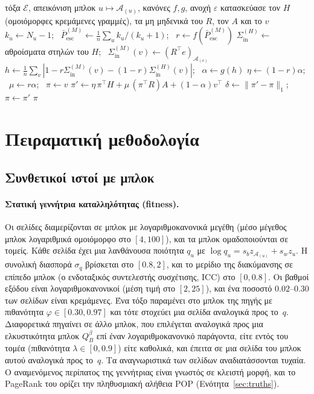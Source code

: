 \documentclass[11pt,a4paper]{article}
\theoremstyle{definition}
\theoremstyle{remark}
\newcommand{\Pbar}{\bar P^{(M)}_{\mathrm{esc}}}
\newcommand{\Sin}{\Sigma_{\mathrm{in}}}
\begin{document}
\begin{algorithm}[t]
\caption{Βαθμονομημένο NCDawareRank δύο σταδίων}
\label{alg:twostage}
\begin{algorithmic}[1]
\Require τόξα $\mathcal E$, απεικόνιση μπλοκ $u\mapsto\mathcal A_{(u)}$, κανόνες $f,g$, ανοχή $\varepsilon$
\State κατασκεύασε τον $H$ (ομοιόμορφες κρεμάμενες γραμμές), τα μη μηδενικά του $R$, τον $A$ και το $v$ 
\State $k_u\gets N_u-1$; \ $\Pbar\gets\frac1n\sum_u k_u/(k_u+1)$; \ $r\gets f(\Pbar)$ 
\State $\Sin^{(H)}\gets$ αθροίσματα στηλών του $H$; \ $\Sin^{(M)}(v)\gets(R^\top e)_{\mathcal A_{(v)}}$
\State $h\gets\frac1n\sum_v|1-r\Sin^{(M)}(v)-(1-r)\Sin^{(H)}(v)|$; \ $\alpha\gets g(h)$ 
\State $\eta\gets(1-r)\alpha$; \ $\mu\gets r\alpha$; \ $\pi\gets v$
\Repeat
  \State $\pi'\gets\eta\,\pi^\top H+\mu\,(\pi^\top R)A+(1-\alpha)v^\top$ 
  \State $\delta\gets\|\pi'-\pi\|_1$; \ $\pi\gets\pi'$
\Until{$\delta<\varepsilon$}
\State \Return $\pi$
\end{algorithmic}
\end{algorithm}

\section{Πειραματική μεθοδολογία}
\label{sec:method}

\subsection{Συνθετικοί ιστοί με μπλοκ}
\paragraph{Στατική γεννήτρια καταλληλότητας (fitness).} Οι σελίδες διαμερίζονται σε μπλοκ με
λογαριθμοκανονικά μεγέθη (μέσο μέγεθος μπλοκ λογαριθμικά ομοιόμορφο στο $[4,100]$), και τα μπλοκ
ομαδοποιούνται σε τομείς. Κάθε σελίδα έχει μια λανθάνουσα ποιότητα $q_u$ με
$\log q_u=s_bz_{\mathcal A_{(u)}}+s_wz_u$. Η συνολική διασπορά $\sigma_q$ βρίσκεται στο $[0.8,2]$, και
το μερίδιο της διακύμανσης σε επίπεδο μπλοκ (ο ενδοταξικός συντελεστής συσχέτισης, ICC) στο
$[0,0.8]$. Οι βαθμοί εξόδου είναι λογαριθμοκανονικοί (μέση τιμή στο $[2,25]$), και ένα ποσοστό
$0.02$--$0.30$ των σελίδων είναι κρεμάμενες. Ένα τόξο παραμένει στο μπλοκ της πηγής με πιθανότητα
$\varphi\in[0.30,0.97]$ και τότε στοχεύει μια σελίδα αναλογικά προς το~$q$. Διαφορετικά πηγαίνει σε
άλλο μπλοκ, που επιλέγεται αναλογικά προς μια ελκυστικότητα μπλοκ $Q_B^\beta$ επί έναν
λογαριθμοκανονικό παράγοντα, είτε εντός του τομέα (πιθανότητα $\lambda\in[0,0.9]$) είτε καθολικά, και
έπειτα σε μια σελίδα του μπλοκ αυτού αναλογικά προς το~$q$. Τα αναγνωριστικά των σελίδων αναδιατάσσονται
τυχαία. Ο αναμενόμενος περίπατος της γεννήτριας είναι γνωστός σε κλειστή μορφή, και το PageRank του
ορίζει την πληθυσμιακή αλήθεια POP (Ενότητα~\ref{sec:truths}).
\end{document}
